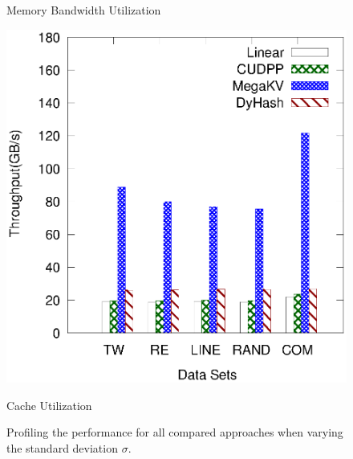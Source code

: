 \begin{figure}[h]
\begin{minipage}{0.3\linewidth}
	\centerline{Memory Bandwidth Utilization}
	\end{minipage}
	\hfill
	\begin{minipage}{0.3\linewidth}\centering
	\includegraphics[width=\linewidth]{pic/static-profi/L2-read.eps}
	\centerline{Cache Utilization}
	\end{minipage}
	\caption{Profiling the  performance for all compared approaches when varying the standard deviation $\sigma$.}
	\label{fig:static}
\end{figure}

